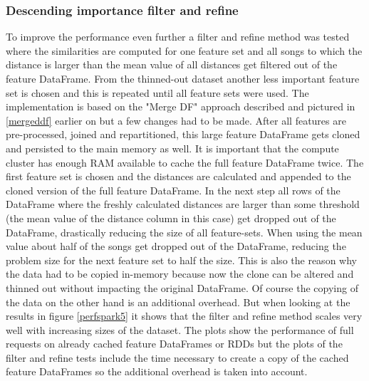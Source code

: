 \subsubsection{Descending importance filter and refine}

To improve the performance even further a filter and refine method was tested where the similarities are computed for one feature set and all songs to which the distance is larger than the mean value of all distances get filtered out of the feature DataFrame. From the thinned-out dataset another less important feature set is chosen and this is repeated until all feature sets were used. 
The implementation is based on the "Merge DF" approach described and pictured in \ref{mergeddf} earlier on but a few changes had to be made. After all features are pre-processed, joined and repartitioned, this large feature DataFrame gets cloned and persisted to the main memory as well. It is important that the compute cluster has enough RAM available to cache the full feature DataFrame twice. 
The first feature set is chosen and the distances are calculated and appended to the cloned version of the full feature DataFrame. 
In the next step all rows of the DataFrame where the freshly calculated distances are larger than some threshold (the mean value of the distance column in this case) get dropped out of the DataFrame, drastically reducing the size of all feature-sets.
When using the mean value about half of the songs get dropped out of the DataFrame, reducing the problem size for the next feature set to half the size. This is also the reason why the data had to be copied in-memory because now the clone can be altered and thinned out without impacting the original DataFrame. Of course the copying of the data on the other hand is an additional overhead. 
But when looking at the results in figure \ref{perfspark5} it shows that the filter and refine method scales very well with increasing sizes of the dataset. The plots show the performance of full requests on already cached feature DataFrames or RDDs but the plots of the filter and refine tests include the time necessary to create a copy of the cached feature DataFrames so the additional overhead is taken into account. 

